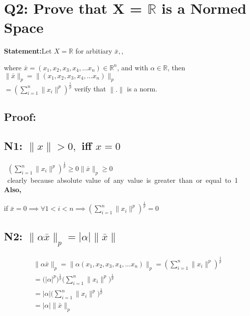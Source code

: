 \documentclass[12pt]{article}
\begin{document}
\section{Q2: Prove that X = $\mathbb{R}$ is a Normed Space}

\textbf{Statement:}Let $X = \mathbb{R}$ for arbitiary $\bar{x},$,

where $\bar{x} = (x_{1}, x_{2},x_{3}, x_{4},\dots x_{n}) \in \mathbb{R}^{n}$, and with $\alpha \in \mathbb{R}$, then $\| \bar{x}\|_{p} = \|(x_{1}, x_{2},x_{3}, x_{4},\dots x_{n})\|_{p}$ \\
$ = (\sum_{i = 1}^{n} \|x_{i}\|^{p})^{\frac{1}{p}}$
verify that $ \|.\|$ is a norm. \\

\subsection*{\textbf{Proof:}}




\subsection*{N1: $ \|x\| > 0,$ iff $x = 0$} 

\hbox{
  $(\sum_{i = 1}^{n} \|x_{i}\|^{p})^{\frac{1}{p}} \geq 0$ \\$\| \bar{x}\|_{p} \geq 0$ clearly because absolute value of any value is greater than or equal to 1
   \\

}
\textbf{Also,}

if $\bar{x} = 0 \implies \forall 1 < i < n \implies (\sum_{i = 1}^{n} \|x_{i}\|^{p})^{\frac{1}{p}} = 0$ \\


\subsection*{N2: $ \| \alpha \bar{x} \|_{p} = | \alpha |  \|\bar{x}\|$} 


\begin{center}
    \begin{eqnarray*}
      \| \alpha \bar{x} \|_{p} =  \| \alpha(x_{1}, x_{2},x_{3}, x_{4},\dots x_{n}) \|_{p} = (\sum_{i = 1}^{n} \|x_{i}\|^{p})^{\frac{1}{p}} \\
      = \biggl(|\alpha|^{p}\biggr)^{\frac{1}{p}} \biggl(\sum_{i = 1}^{n} \|x_{i}\|^{p}\biggr)^{\frac{1}{p}} \\
      = |\alpha| \biggl(\sum_{i = 1}^{n} \|x_{i}\|^{p}\biggr)^{\frac{1}{p}} \\
      = |\alpha|\| \bar{x} \|_{p}
    \end{eqnarray*}
\end{center}
\end{document}
